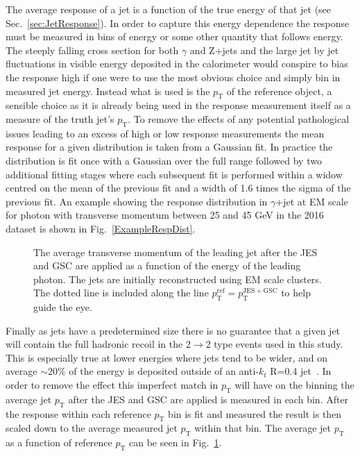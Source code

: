 The average response of a jet is a function of the true energy of that jet (see Sec.~\ref{sec:JetResponse}).  
In order to capture this energy dependence the response must be measured in bins of energy or some other quantity that follows energy.  
The steeply falling cross section for both $\gamma$ and Z+jets and the large jet by jet fluctuations in visible energy deposited in the calorimeter would conspire to bias the response high if one were to use the most obvious choice and simply bin in measured jet energy.  
Instead what is used is the $p_{\mathrm T}$ of the reference object, a sensible choice as it is already being used in the response measurement itself as a measure of the truth jet's $p_{\mathrm T}$.  
To remove the effects of any potential pathological issues leading to an excess of high or low response measurements the mean response for a given distribution is taken from a Gaussian fit.  
In practice the distribution is fit once with a Gaussian over the full range followed by two additional fitting stages where each subsequent fit is performed within a widow centred on the mean of the previous fit and a width of 1.6 times the sigma of the previous fit.  
An example showing the response distribution in $\gamma$+jet at EM scale for photon with transverse momentum between 25 and 45 GeV in the 2016 dataset is shown in Fig.~\ref{ExampleRespDist}.  

\begin{figure}[!ht]
\begin{center}
\end{center}
\caption[Average measured jet momentum Vs. refence $p_{\mathrm T}$]
{\small The average transverse momentum of the leading jet after the JES and GSC are applied as a function of the energy of the leading photon.  The jets are initially reconstructed using EM scale clusters.  The dotted line is included along the line $p_{\mathrm T}^{\mathrm {ref}}=p_{\mathrm T}^{\mathrm{JES+GSC}}$ to help guide the eye.}
\label{plot:MappingExample}
\end{figure}


Finally as jets have a predetermined size there is no guarantee that a given jet will contain the full hadronic recoil in the 2$\rightarrow$2 type events used in this study.  
This is especially true at lower energies where jets tend to be wider, and on average $\sim$20\% of the energy is deposited outside of an anti-$k_t$ R=0.4 jet~\cite{ATLAS-CONF-2015-057}.  
In order to remove the effect this imperfect match in $p_{\mathrm T}$ will have on the binning the average jet $p_{\mathrm T}$ after the JES and GSC are applied is measured in each bin.  
After the response within each reference $p_{\mathrm T}$ bin is fit and measured the result is then scaled down to the average measured jet $p_{\mathrm T}$ within that bin.  
The average jet $p_{\mathrm T}$ as a function of reference $p_{\mathrm T}$ can be seen in Fig.~\ref{plot:MappingExample}.  


